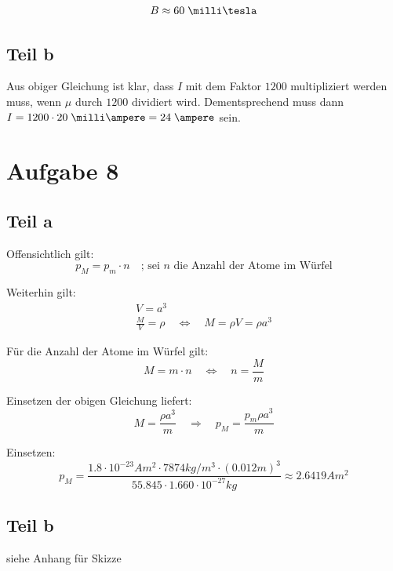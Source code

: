 \documentclass[a4paper,german,12pt,smallheadings]{scrartcl}
\begin{document}
\begin{align*}
  B \approx 60 \;\milli\tesla
\end{align*}

\subsection*{Teil b}
Aus obiger Gleichung ist klar, dass $I$ mit dem Faktor $1200$ multipliziert
werden muss, wenn $\mu$ durch $1200$ dividiert wird. Dementsprechend muss dann
$I = 1200 \cdot 20\;\milli\ampere = 24\;\ampere$ sein.


\section*{Aufgabe 8}
\subsection*{Teil a}

Offensichtlich gilt:
\begin{equation*}
p_M=p_m \cdot n \quad \text{; sei $n$ die Anzahl der Atome im Würfel}
\end{equation*}

Weiterhin gilt:
\begin{align*}
V=a^3\\
\frac{M}{V}=\rho \quad \Leftrightarrow \quad M=\rho V = \rho a^3
\end{align*}

Für die Anzahl der Atome im Würfel gilt:
\begin{equation*}
M=m\cdot n \quad \Leftrightarrow \quad n=\frac{M}{m}
\end{equation*}

Einsetzen der obigen Gleichung liefert:
\begin{equation*}
M=\frac{\rho a^3}{m} \quad \Rightarrow \quad p_M=\frac{p_m \rho a^3}{m}
\end{equation*}

Einsetzen:
\begin{equation*}
p_M=\frac{1.8 \cdot 10^{-23}Am^2 \cdot 7874 kg/m^3 \cdot (0.012m)^3}{55.845 \cdot 1.660 \cdot 10^{-27}kg} \approx 2.6419 Am^2
\end{equation*}

\subsection*{Teil b}
siehe Anhang für Skizze\\
\end{document}
